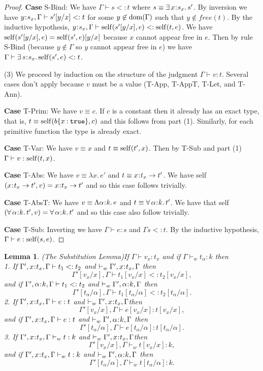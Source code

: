 \documentclass[11pt]{article}
\newtheorem{lemma}[theorem]{Lemma}
\newcommand{\al}{\alpha}
\newcommand{\bind}{\hspace{0.05em}{:}\hspace{0.05em}} %
\newcommand{\col}{\mathbin{:}}       %
\newcommand{\true}{\mathtt{true}}
\newcommand{\existype}[3]{\exists\, #1\bind #2.\, #3}
\newcommand{\polytype}[3]{\forall\, #1\bind #2.\, #3}
\newcommand{\functype}[3]{#1\bind #2 \rightarrow #3}
\newcommand{\dom}[1]{{\rm dom}(#1)}
\begin{document}
\begin{proof}
{\bf Case} {\sc S-Bind}: We have $\Gamma \vdash s <: t$ where $s \equiv \existype{x}{s_x}{s'}$. By inversion we have $y\bind s_x, \Gamma \vdash s'[y/x] <: t$ for some $y\not\in\dom{\Gamma}$ such that $y\not\in free(t)$. By the inductive hypothesis, $y\bind s_x, \Gamma \vdash {\rm self}(s'[y/x],e) <: {\rm self}(t,e)$. We have ${\rm self}(s'[y/x],e) = {\rm self}(s',e)[y/x]$ because $x$ cannot appear free in $e$. Then by rule {\sc S-Bind} (because $y\not\in\Gamma$ so $y$ cannot appear free in $e$) we have $\Gamma \vdash \existype{s}{s_x}{{\rm self}(s',e)} <: t$.

(3) We proceed by induction on the structure of the judgment $\Gamma \vdash v : t$. Several cases don't apply because $v$ must be a value ({\sc T-App}, {\sc T-AppT}, {\sc T-Let}, and {\sc T-Ann}).

{\bf Case} {\sc T-Prim}: We have $v \equiv c$. If $c$ is a constant then it already has an exact type, that is, $t \equiv {\rm self}(b\{x\col\true\}, c)$ and this follows from part (1). Similarly, for each primitive function the type is already exact.

{\bf Case} {\sc T-Var}: We have $v \equiv x$ and $t \equiv {\rm self}(t',x)$. Then by {\sc T-Sub} and part (1) $\Gamma \vdash v : {\rm self}(t,x)$.

{\bf Case} {\sc T-Abs}: We have $v \equiv \lambda x.\, e'$ and $t\equiv \functype{x}{t_x}{t'}$. We have self$(\functype{x}{t_x}{t'}, v) = \functype{x}{t_x}{t'}$ and so this case follows trivially.

{\bf Case} {\sc T-AbsT}: We have $v \equiv \Lambda \al\bind k.\, e$ and $t \equiv \polytype{\al}{k}{t'}$. We have that self$(\polytype{\al}{k}{t'}, v) = \polytype{\al}{k}{t'}$ and so this case also follow trivially.

{\bf Case} {\sc T-Sub}: Inverting we have $\Gamma \vdash e : s$ and $\Gamma s <: t$. By the inductive hypothesis, $\Gamma \vdash e : {\rm self}(s,e)$. 
\end{proof}

\begin{lemma}(The Substitution Lemma)\label{substitution}
If $\Gamma \vdash v_x : t_x$ and if $\Gamma \vdash_w t_\al : k$ then\\
1. If\; $\Gamma', x\bind t_x, \Gamma \vdash t_1 <: t_2$ and $\vdash_w \Gamma', x\bind t_x, \Gamma$ then
\[
\Gamma'[v_x/x], \Gamma \vdash t_1[v_x/x] <: t_2[v_x/x],
\]
and if\; $\Gamma', \al\bind k, \Gamma \vdash t_1 <: t_2$ and $\vdash_w \Gamma', \al\bind k, \Gamma$ then
\[
\Gamma'[t_\al/\al], \Gamma \vdash t_1[t_\al/\al] <: t_2[t_\al/\al].
\]
2. If\; $\Gamma', x\bind t_x, \Gamma \vdash e : t$ and $\vdash_w \Gamma', x\bind t_x, \Gamma$then
\[
\Gamma'[v_x/x], \Gamma \vdash e[v_x/x] : t[v_x/x],
\]
and if\; $\Gamma', x\bind t_x, \Gamma \vdash e : t$ and $\vdash_w \Gamma', \al\bind k, \Gamma$ then
\[
\Gamma'[t_\al/\al], \Gamma \vdash e[t_\al/\al] : t[t_\al/\al].
\]
3. If\; $\Gamma', x\bind t_x, \Gamma \vdash_w t : k$ and $\vdash_w \Gamma', x\bind t_x, \Gamma$then
\[
\Gamma'[v_x/x], \Gamma \vdash_w t[v_x/x] : k,
\]
and if\; $\Gamma', x\bind t_x, \Gamma \vdash_w t : k$ and $\vdash_w \Gamma', \al\bind k, \Gamma$ then
\[
\Gamma'[t_\al/\al], \Gamma \vdash_w t[t_\al/\al] : k.
\]
\end{lemma}
\end{document}
